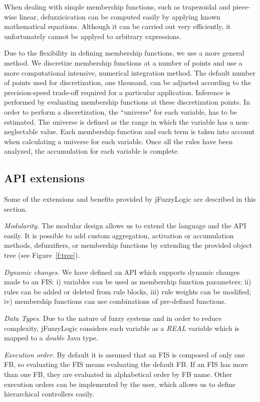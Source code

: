 \documentclass[11pt,twoside]{article}
\begin{document}
\begin{multicols}{2}
When dealing with simple membership functions, such as trapezoidal and piece-wise linear, defuzzicication can be computed easily by applying known mathematical equations.
Although it can be carried out very efficiently, it unfortunately cannot be applyed to arbitrary expressions.

Due to the flexibility in defining membership functions, we use a more general method. We discretize membership functions at a number of points and use a more computational intensive, numerical integration method. The default number of points used for discretization, one thousand, can be adjusted according to the precision-speed trade-off required for a particular application. Inference is performed by evaluating membership functions at these discretization points. In order to perform a discretization, the ``universe" for each variable, has to be estimated. The universe is defined as the range in which the variable has a non-neglectable value. Each membership function and each term is taken into account when calculating a universe for each variable. Once all the rules have been analyzed, the accumulation for each variable is complete. 


\subsection{API extensions \label{sec:ext}}

Some of the extensions and benefits provided by jFuzzyLogic are described in this section.

\textit{Modularity.} The modular design allows us to extend the language and the API easily. It is possible to add custom aggregation, activation or accumulation methods, defuzzifiers, or membership functions by extending the provided object tree (see Figure~\ref{f:tree}). 

\textit{Dynamic changes.} We have defined an API which supports dynamic changes made to an FIS: i) variables can be used as membership function parameters; ii) rules can be added or deleted from rule blocks, iii) rule weights can be modified; iv) membership functions can use combinations of pre-defined functions. 

\textit{Data Types.} Due to the nature of fuzzy systems and in order to reduce complexity, jFuzzyLogic considers each variable as a \textit{REAL} variable which is mapped to a \textit{double} Java type.

\textit{Execution order.} By default it is assumed that an FIS is composed of only one FB, so evaluating the FIS means evaluating the default FB.  If an FIS has more than one FB, they are evaluated in alphabetical order by FB name. Other execution orders can be implemented by the user, which allows us to define hierarchical controllers easily.



\end{multicols}
\end{document}
